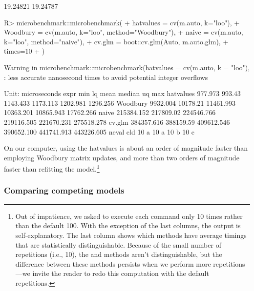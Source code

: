 \documentclass[
]{jss}
\begin{document}
\begin{CodeChunk}
\begin{CodeOutput}
[1] 19.24821 19.24787
\end{CodeOutput}
\begin{CodeInput}
R> microbenchmark::microbenchmark(
+   hatvalues = cv(m.auto, k="loo"),
+   Woodbury = cv(m.auto, k="loo", method="Woodbury"),
+   naive = cv(m.auto, k="loo", method="naive"),
+   cv.glm = boot::cv.glm(Auto, m.auto.glm),
+   times=10
+ )
\end{CodeInput}
\begin{CodeOutput}
Warning in microbenchmark::microbenchmark(hatvalues = cv(m.auto, k = "loo"), :
less accurate nanosecond times to avoid potential integer overflows
\end{CodeOutput}
\begin{CodeOutput}
Unit: microseconds
      expr        min        lq       mean     median         uq        max
 hatvalues    977.973    993.43   1143.433   1173.113   1202.981   1296.256
  Woodbury   9932.004  10178.21  11461.993  10363.201  10865.943  17762.266
     naive 215384.152 217809.02 224546.766 219116.505 221670.231 275518.278
    cv.glm 384357.616 388159.59 409612.546 390652.100 441741.913 443226.605
 neval cld
    10 a  
    10 a  
    10  b 
    10   c
\end{CodeOutput}
\end{CodeChunk}

On our computer, using the hatvalues is about an order of magnitude
faster than employing Woodbury matrix updates, and more than two orders
of magnitude faster than refitting the model.\footnote{Out of
  impatience, we asked  to execute each command
  only 10 times rather than the default 100. With the exception of the
  last columns, the output is self-explanatory. The last column shows
  which methods have average timings that are statistically
  distinguishable. Because of the small number of repetitions (i.e.,
  10), the  and  methods aren't
  distinguishable, but the difference between these methods persists
  when we perform more repetitions---we invite the reader to redo this
  computation with the default  repetitions.}

\hypertarget{comparing-competing-models}{%
\subsubsection{Comparing competing
models}\label{comparing-competing-models}}
\end{document}

